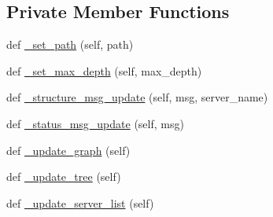 \subsection*{Private Member Functions}
\begin{DoxyCompactItemize}
\item 
def \hyperlink{classsmacc__viewer_1_1SmaccViewerFrame_a7263344a2979e9d989f0142a15d1b1f2}{\+\_\+set\+\_\+path} (self, path)
\item 
def \hyperlink{classsmacc__viewer_1_1SmaccViewerFrame_a86f358ee6df80b185f70292675070a8d}{\+\_\+set\+\_\+max\+\_\+depth} (self, max\+\_\+depth)
\item 
def \hyperlink{classsmacc__viewer_1_1SmaccViewerFrame_a6109f62a87363f5254173cbb1467bcc8}{\+\_\+structure\+\_\+msg\+\_\+update} (self, msg, server\+\_\+name)
\item 
def \hyperlink{classsmacc__viewer_1_1SmaccViewerFrame_af5e341bd874c8402738aec02cc598cca}{\+\_\+status\+\_\+msg\+\_\+update} (self, msg)
\item 
def \hyperlink{classsmacc__viewer_1_1SmaccViewerFrame_a35f35c81cd523594a190625c64baabb6}{\+\_\+update\+\_\+graph} (self)
\item 
def \hyperlink{classsmacc__viewer_1_1SmaccViewerFrame_a90feb38b367507c17414166bed07e353}{\+\_\+update\+\_\+tree} (self)
\item 
def \hyperlink{classsmacc__viewer_1_1SmaccViewerFrame_a628e18936213355fab4eb60fbb35ae09}{\+\_\+update\+\_\+server\+\_\+list} (self)
\end{DoxyCompactItemize}
